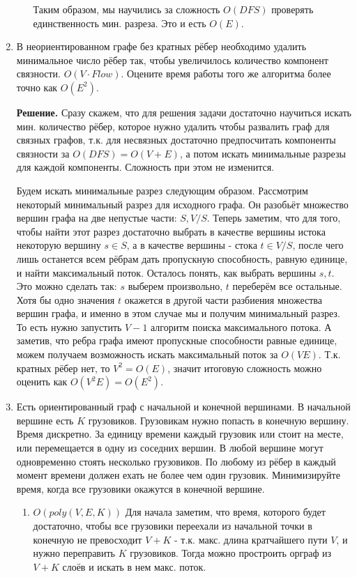 \begin{enumerate}
\begin{enumerate}
		Таким образом, мы научились за сложность $O(DFS)$ проверять единственность мин. разреза. Это и есть 
		$O(E)$.
	\end{enumerate}
	
	\item В неориентированном графе без кратных рёбер необходимо удалить минимальное число рёбер так, чтобы 
	увеличилось количество компонент связности. $O(V \cdot Flow)$. Оцените время работы	того же алгоритма более 
	точно как $O(E^2)$.
	
	
	\textbf{Решение.} Сразу скажем, что для решения задачи достаточно научиться искать мин. количество рёбер, 
	которое нужно удалить чтобы развалить граф для связных графов, т.к. для несвязных достаточно предпосчитать 
	компоненты связности за $O(DFS) = O(V + E)$, а потом искать минимальные разрезы для каждой компоненты. 
	Сложность при этом не изменится.
	
	Будем искать минимальные разрез следующим образом. Рассмотрим некоторый минимальный разрез для исходного 
	графа. Он разобьёт множество вершин графа на две непустые части: $S, V / S$. Теперь заметим, 
	что для того, чтобы найти этот разрез достаточно выбрать в качестве вершины истока некоторую вершину $s \in 
	S$, а в качестве вершины - стока $t \in V / S$, после чего лишь останется всем рёбрам дать пропускную 
	способность, равную единице, и найти максимальный поток. Осталось понять, как выбрать вершины $s, t$. 
	Это можно сделать так: $s$ выберем произвольно, $t$ переберём все остальные. Хотя бы одно значения 
	$t$ окажется в другой части разбиения множества вершин графа, и именно в этом случае мы и получим минимальный 
	разрез. То есть нужно запустить $V - 1$ алгоритм поиска максимального потока. А заметив, что ребра графа 
	имеют пропускные способности равные единице, можем получаем возможность искать максимальный поток за $O(VE)$. 
	Т.к. кратных рёбер нет, то $V^2 = O(E)$, значит итоговую сложность можно оценить как $O(V^2E) = O(E^2)$. 
	
	\item Есть ориентированный граф с начальной и конечной вершинами. В начальной вершине есть $K$ грузовиков. 
	Грузовикам нужно попасть в конечную вершину. Время дискретно. За единицу времени каждый грузовик или стоит на 
	месте, или перемещается в одну из соседних вершин. В любой вершине могут одновременно стоять несколько 
	грузовиков. По любому из рёбер в каждый момент времени должен ехать не более чем один грузовик. Минимизируйте 
	время, когда все грузовики окажутся в конечной вершине.
	\begin{enumerate}
		\item $O(poly(V, E, K))$
		Для начала заметим, что время, которого будет достаточно, чтобы все грузовики переехали из начальной 
		точки в конечную не превосходит $V + K$ - т.к. макс. длина кратчайшего пути $V$, и нужно переправить $K$ 
		грузовиков. Тогда можно простроить орграф из $V + K$ слоёв и искать в нем макс. поток. 
		

\end{enumerate}
\end{enumerate}
